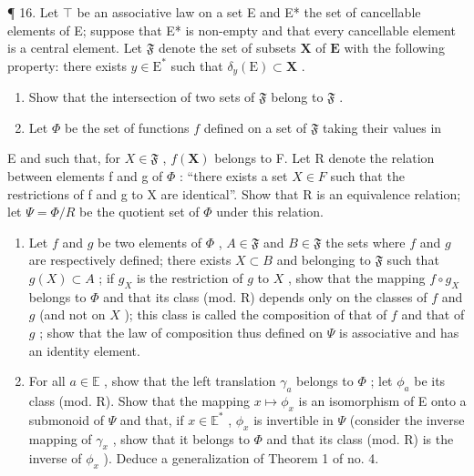 ¶ 16. Let \(\top\) be an associative law on a set E and E* the set of cancellable elements of E; suppose that E* is non-empty and that every cancellable element is a central element. Let \(\mathfrak{F}\) denote the set of subsets \(\mathbf{X}\) of \(\mathbf{E}\) with the following property: there exists \(y \in \mathrm{E}^*\) such that \(\delta_y(\mathrm{E}) \subset \mathbf{X}\) .

\begin{enumerate}
\def\labelenumi{(\alph{enumi})}
\item
  Show that the intersection of two sets of \(\mathfrak{F}\) belong to \(\mathfrak{F}\) .
\item
  Let \(\Phi\) be the set of functions \(f\) defined on a set of \(\mathfrak{F}\) taking their values in
\end{enumerate}

E and such that, for \(X \in \mathfrak{F}\) , \(f(\mathbf{X})\) belongs to F. Let R denote the relation between elements f and g of \(\Phi\) : ``there exists a set \(X \in F\) such that the restrictions of f and g to X are identical''. Show that R is an equivalence relation; let \(\Psi = \Phi/R\) be the quotient set of \(\Phi\) under this relation.

\begin{enumerate}
\def\labelenumi{(\alph{enumi})}
\setcounter{enumi}{2}
\item
  Let \(f\) and \(g\) be two elements of \(\Phi\) , \(A \in \mathfrak{F}\) and \(B \in \mathfrak{F}\) the sets where \(f\) and \(g\) are respectively defined; there exists \(X \subset B\) and belonging to \(\mathfrak{F}\) such that \(g(X) \subset A\) ; if \(g_X\) is the restriction of \(g\) to \(X\) , show that the mapping \(f \circ g_X\) belongs to \(\Phi\) and that its class (mod. R) depends only on the classes of \(f\) and \(g\) (and not on \(X\) ); this class is called the composition of that of \(f\) and that of \(g\) ; show that the law of composition thus defined on \(\Psi\) is associative and has an identity element.
\item
  For all \(a \in \mathbb{E}\) , show that the left translation \(\gamma_{a}\) belongs to \(\Phi\) ; let \(\phi_{a}\) be its class (mod. R). Show that the mapping \(x \mapsto \phi_{x}\) is an isomorphism of E onto a submonoid of \(\Psi\) and that, if \(x \in \mathbb{E}^{*}\) , \(\phi_{x}\) is invertible in \(\Psi\) (consider the inverse mapping of \(\gamma_{x}\) , show that it belongs to \(\Phi\) and that its class (mod. R) is the inverse of \(\phi_{x}\) ). Deduce a generalization of Theorem 1 of no. 4.
\end{enumerate}

